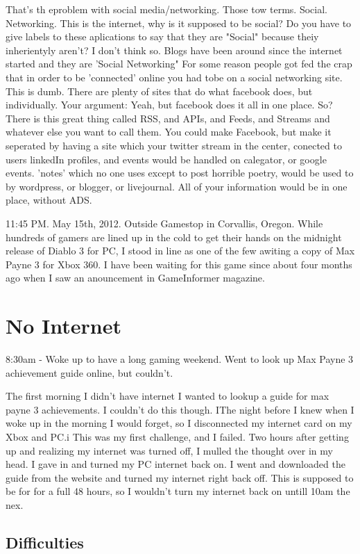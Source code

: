 \documentclass[12pt,letterpaper]{article}
\begin{document}
That's th eproblem with social media/networking. Those tow terms.
Social. Networking. This is the internet, why is it supposed to be
social? Do you have to give labels to these aplications to say that they
are "Social" because theiy inherientyly aren't? I don't think so. Blogs
have been around since the internet started and they are 'Social
Networking" For some reason people got fed the crap that in order to be
'connected' online you had tobe on a social networking site. This is
dumb. There are plenty of sites that do what facebook does, but
individually. Your argument: Yeah, but facebook does it all in one
place. So? There is this great thing called RSS, and APIs, and Feeds,
and Streams and whatever else you want to call them. You could make
Facebook, but make it seperated by having a site which your twitter
stream in the center, conected to users linkedIn profiles, and events
would be handled on calegator, or google events. 'notes' which no one
uses except to post horrible poetry, would be used to by wordpress, or
blogger, or livejournal.  All of your information would be in one place,
without ADS.


11:45 PM. May 15th, 2012. Outside Gamestop in Corvallis, Oregon. While hundreds of gamers are lined up
in the cold to get their hands on the midnight release of Diablo 3 for
PC, I stood in line as one of the few awiting a copy of Max Payne 3 for
Xbox 360. I have been waiting for this game since about four months ago
when I saw an anouncement in GameInformer magazine. 


\section{No Internet}
8:30am - Woke up to have a long gaming weekend. Went to look up Max
Payne 3 achievement guide online, but couldn't.

The first morning I didn't have internet I wanted to lookup a guide for
max payne 3 achievements. I couldn't do this though. IThe night before I
knew when I woke up in the morning I would forget, so I disconnected my
internet card on my Xbox and PC.i This was my first challenge, and I
failed. Two hours after getting up and realizing my internet was turned
off, I mulled the thought over in my head.  I gave in and turned my PC
internet back on. I went and downloaded the guide from the website and
turned my internet right back off. This is supposed to be for for a full
48 hours, so I wouldn't turn my internet back on untill 10am the nex.


\subsection{Difficulties}
\end{document}
